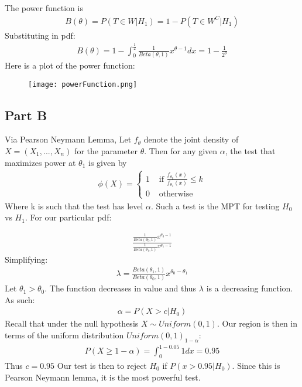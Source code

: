 \documentclass{article}
\begin{document}
The power function is
\begin{align*}
B(\theta) = P(T \in W|H_1) = 1-P(T \in W^C|H_1)
\end{align*}
Substituting in pdf:
\begin{align*}
B(\theta) =  1 - \int_{0}^{\frac{1}{2}} \frac{1}{Beta(\theta,1)} x^{\theta-1} dx = 1-\frac{1}{2^\theta}
\end{align*}
Here is a plot of the power function:
\begin{figure}[hbt!]
\centering
\texttt{[image: powerFunction.png]}
\end{figure}
\clearpage

\subsection*{Part B}
Via Pearson Neymann Lemma, Let $f_{\theta}$ denote the joint density of $X = (X_1, . . . , X_n)$ for the parameter $\theta$. Then for any given $\alpha$, the test that maximizes power at $\theta_1$ is given by
\begin{align*}
\phi(X)  =
\begin{cases} 
      1 & \text{ if } \frac{f_{\theta_0}(x)}{f_{\theta_1}(x)} \leq k \\
      0 & \text{ otherwise  }
   \end{cases}
\end{align*}
Where k is such that the test has level $\alpha$. Such a test is the MPT for testing $H_0$ vs $H_1$. For our particular pdf:

\begin{align*}
\frac{\frac{1}{Beta(\theta_0,1)} x^{\theta_0-1}}{\frac{1}{Beta(\theta_1,1)} x^{\theta_1-1}}
\end{align*}
Simplifying:
\begin{align*}
\lambda = \frac{Beta(\theta_1,1)}{Beta(\theta_0,1)} x^{\theta_0-\theta_1}
\end{align*}
Let $\theta_1>\theta_0$. The function decreases in value and thus $\lambda$ is a decreasing function. As such:
\begin{align*}
\alpha = P(X > c|H_0)
\end{align*}
Recall that under the null hypothesis $X \sim Uniform(0,1)$. Our region is then in terms of the uniform distribution $Uniform(0,1)_{1-\alpha}$:
\begin{align*}
P(X \geq 1-\alpha) = \int_{0}^{1-0.05} 1 dx = 0.95
\end{align*}
Thus $c=0.95$
Our test is then to reject $H_0$ if $P(x>0.95|H_0)$. Since this is Pearson Neymann lemma, it is the most powerful test.
\end{document}
